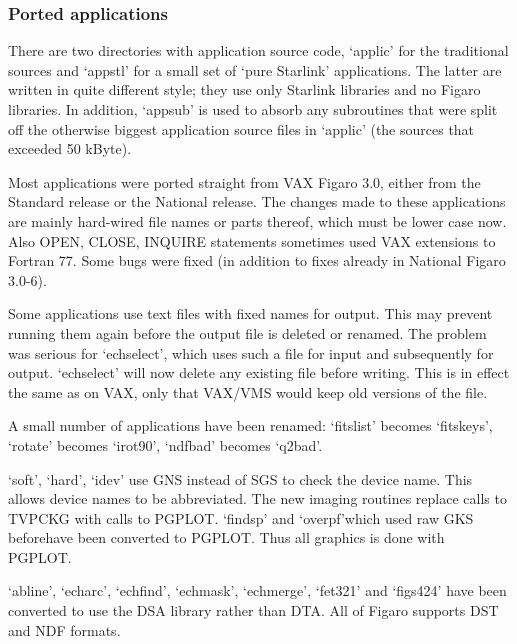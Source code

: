 
\subsubsection{\label{changessub3}Ported applications}

   There are two directories with application source code, `applic' for
   the traditional sources and `appstl' for a small set of `pure
   Starlink' applications.  The latter are written in quite different
   style; they use only Starlink libraries and no Figaro libraries.  In
   addition, `appsub' is used to absorb any subroutines that were split
   off the otherwise biggest application source files in
   `applic' (the sources that exceeded 50 kByte).

   Most applications were ported straight from VAX Figaro 3.0, either
   from the Standard release or the National release. The changes made
   to these applications are mainly hard-wired file names or parts
   thereof, which must be lower case now. Also OPEN, CLOSE, INQUIRE
   statements sometimes used VAX extensions to Fortran 77. Some bugs
   were fixed (in addition to fixes already in National Figaro 3.0-6).

   Some applications use text files with fixed names for output.  This
   may prevent running them again before the output file is deleted or
   renamed. The problem was serious for `echselect', which uses such a
   file for input and subsequently for output. `echselect' will now
   delete any existing file before writing.  This is in effect the same
   as on VAX, only that VAX/VMS would keep old versions of the file.

   A small number of applications have been renamed: `fitslist' becomes
   `fitskeys', `rotate' becomes `irot90', `ndfbad' becomes `q2bad'.

   `soft', `hard', `idev' use GNS instead of SGS to check the device
   name. This allows device names to be abbreviated. The new imaging
   routines replace calls to TVPCKG with calls to PGPLOT. `findsp' and
   `overpf'\latorhtm{---}{-}which used raw GKS before\latorhtm{---}{-}have
   been converted to PGPLOT. Thus all graphics is done with PGPLOT.

   `abline', `echarc', `echfind', `echmask', `echmerge', `fet321' and
   `figs424' have been converted to use the DSA library rather than DTA.
   All of Figaro supports DST and NDF formats.

